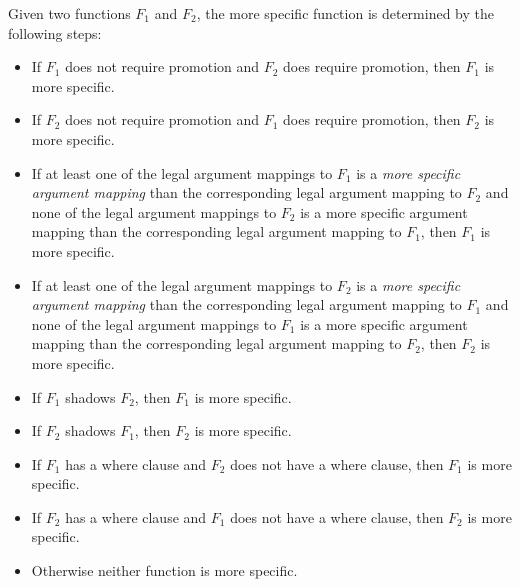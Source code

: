 Given two functions $F_1$ and $F_2$, the more specific function is
determined by the following steps:
\begin{itemize}
\item If $F_1$ does not require promotion and $F_2$ does require promotion, then $F_1$ is more specific.
\item If $F_2$ does not require promotion and $F_1$ does require promotion, then $F_2$ is more specific.
\item
If at least one of the legal argument mappings to $F_1$ is a {\em more
specific argument mapping} than the corresponding legal argument
mapping to $F_2$ and none of the legal argument mappings to $F_2$ is a
more specific argument mapping than the corresponding legal argument
mapping to $F_1$, then $F_1$ is more specific.
\item
If at least one of the legal argument mappings to $F_2$ is a {\em more
specific argument mapping} than the corresponding legal argument
mapping to $F_1$ and none of the legal argument mappings to $F_1$ is a
more specific argument mapping than the corresponding legal argument
mapping to $F_2$, then $F_2$ is more specific.
\item If $F_1$ shadows $F_2$, then $F_1$ is more specific.
\item If $F_2$ shadows $F_1$, then $F_2$ is more specific.
\item If $F_1$ has a where clause and $F_2$ does not have a where clause, then $F_1$ is more specific.
\item If $F_2$ has a where clause and $F_1$ does not have a where clause, then $F_2$ is more specific.
\item Otherwise neither function is more specific.
\end{itemize}

